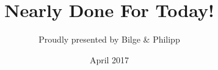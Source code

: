 \documentclass[bibliography=totocnumbered]{scrreprt}
\begin{document}
\title{Nearly Done For Today!}
\author{Proudly presented by Bilge \& Philipp}
\date{April 2017}
\maketitle

\tableofcontents 











\begin{comment}
\end{comment}
\end{document}
